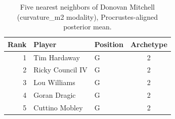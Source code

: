 \begin{table}[htbp]
  \centering\small
  \begin{tabular}{rllc}
    \toprule
    Rank & Player & Position & Archetype \\
    \midrule
    1 & Tim Hardaway & G & 2 \\
    2 & Ricky Council IV & G & 2 \\
    3 & Lou Williams & G & 2 \\
    4 & Goran Dragic & G & 2 \\
    5 & Cuttino Mobley & G & 2 \\
    \bottomrule
  \end{tabular}
  \caption{Five nearest neighbors of Donovan Mitchell (curvature_m2 modality), Procrustes-aligned posterior mean.}
  \label{tab:Donovan_Mitchell_neighbors_curvature_m2}
\end{table}

